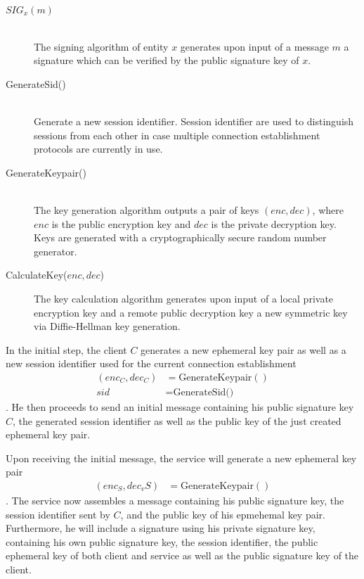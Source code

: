 \begin{description}
    \item[$SIG_x(m)$]\hfill\\
        The signing algorithm of entity $x$ generates upon input of a message $m$ a signature which can be verified by the public signature key of $x$.
    \item[GenerateSid()]\hfill\\
        Generate a new session identifier.
        Session identifier are used to distinguish sessions from each other in case multiple connection establishment protocols are currently in use.
    \item[GenerateKeypair()]\hfill\\
        The key generation algorithm outputs a pair of keys $(enc, dec)$, where $enc$ is the public encryption key and $dec$ is the private decryption key.
        Keys are generated with a cryptographically secure random number generator.
    \item[CalculateKey($enc, dec$)]
        The key calculation algorithm generates upon input of a local private encryption key and a remote public decryption key a new symmetric key via Diffie-Hellman key generation.
\end{description}

In the initial step, the client $C$ generates a new ephemeral key pair as well as a new session identifier used for the current connection establishment
\begin{align*}
    (enc_C, dec_C) &= \text{GenerateKeypair}()\\
    sid &= \text{GenerateSid()}
\end{align*}.
He then proceeds to send an initial message containing his public signature key $C$, the generated session identifier as well as the public key of the just created ephemeral key pair.

Upon receiving the initial message, the service will generate a new ephemeral key pair
\begin{align*}
    (enc_S, dec_vS) &= \text{GenerateKeypair}()
\end{align*}.
The service now assembles a message containing his public signature key, the session identifier sent by $C$, and the public key of his epmehemal key pair.
Furthermore, he will include a signature using his private signature key, containing his own public signature key, the session identifier, the public ephemeral key of both client and service as well as the public signature key of the client.

